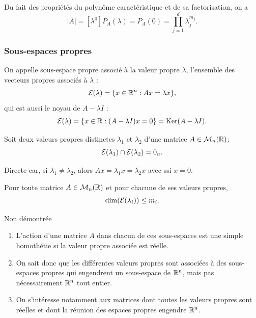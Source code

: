 \proof
  Du fait des propriétés du polynôme caractéristique et de sa factorisation, on a
  $$
  |A| = [\lambda^0]P_A(\lambda) = P_A(0) = \prod_{j=1}^d \lambda_j^{m_j}.
  $$
\eproof

\subsubsection{Sous-espaces propres} 

\begin{definition}
  On appelle sous-espace propre associé à la valeur propre $\lambda$, l'ensemble des vecteurs propres associés à $\lambda$ :
  $$
  \mathcal{E}(\lambda) = \{x \in \mathbb{R}^n: Ax = \lambda x\},
  $$
  qui est aussi le noyau de $A - \lambda I$ : 
  $$
  \mathcal{E}(\lambda) = \{x \in \mathbb{R}: (A - \lambda I)x = 0\} = \text{Ker}(A - \lambda I).
  $$
\end{definition}

\begin{proposition}
  Soit deux valeurs propres distinctes $\lambda_1$ et $\lambda_2$ d'une matrice $A \in \mathcal{M}_n(\mathbb{R})$:
  $$
  \mathcal{E}(\lambda_1) \cap \mathcal{E}(\lambda_2) = 0_n.
  $$
\end{proposition}

\proof
Directe car, si $\lambda_1 \neq \lambda_2$, alors $Ax = \lambda_1 x = \lambda_2 x$ avec  ssi $x = 0$.
\eproof


\begin{proposition}
  Pour toute matrice $A \in \mathcal{M}_n(\mathbb{R})$ et pour chacune de ses valeurs propres, 
  $$
  \dim(\mathcal{E}(\lambda_i)) \leq m_i.
  $$
\end{proposition}

\proof
Non démontrée
\eproof


\remarks
\begin{enumerate}
  \item L'action d'une matrice $A$ dans chacun de ces sous-espaces est une simple homothétie si la valeur propre associée est réelle.
  \item On sait donc que les différentes valeurs propres sont associées à des sous-espaces propres qui engendrent un sous-espace de $\mathbb{R}^n$, mais pas nécessairement $\mathbb{R}^n$ tout entier. 
  \item On s'intéresse notamment aux matrices dont toutes les valeurs propres sont réelles et dont la réunion des espaces propres engendre $\mathbb{R}^n$.
\end{enumerate}


